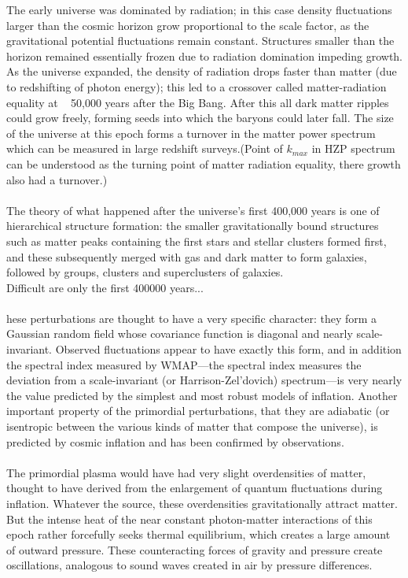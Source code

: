 \begin{description}
The early universe was dominated by radiation; in this case density fluctuations larger than the cosmic horizon grow proportional to the scale factor, as the gravitational potential fluctuations remain constant. Structures smaller than the horizon remained essentially frozen due to radiation domination impeding growth. As the universe expanded, the density of radiation drops faster than matter (due to redshifting of photon energy); this led to a crossover called matter-radiation equality at ~ 50,000 years after the Big Bang. After this all dark matter ripples could grow freely, forming seeds into which the baryons could later fall. The size of the universe at this epoch forms a turnover in the matter power spectrum which can be measured in large redshift surveys.(Point of $k_{max}$ in HZP spectrum can be understood as the turning point of matter radiation equality, there growth also had a turnover.)
\\
\\
The theory of what happened after the universe's first 400,000 years is one of hierarchical structure formation: the smaller gravitationally bound structures such as matter peaks containing the first stars and stellar clusters formed first, and these subsequently merged with gas and dark matter to form galaxies, followed by groups, clusters and superclusters of galaxies.\\
Difficult are only the first 400000 years...\\
\\
hese perturbations are thought to have a very specific character: they form a Gaussian random field whose covariance function is diagonal and nearly scale-invariant. Observed fluctuations appear to have exactly this form, and in addition the spectral index measured by WMAP—the spectral index measures the deviation from a scale-invariant (or Harrison-Zel'dovich) spectrum—is very nearly the value predicted by the simplest and most robust models of inflation. Another important property of the primordial perturbations, that they are adiabatic (or isentropic between the various kinds of matter that compose the universe), is predicted by cosmic inflation and has been confirmed by observations.
\\
\\
The primordial plasma would have had very slight overdensities of matter, thought to have derived from the enlargement of quantum fluctuations during inflation. Whatever the source, these overdensities gravitationally attract matter. But the intense heat of the near constant photon-matter interactions of this epoch rather forcefully seeks thermal equilibrium, which creates a large amount of outward pressure. These counteracting forces of gravity and pressure create oscillations, analogous to sound waves created in air by pressure differences.


\end{description}
